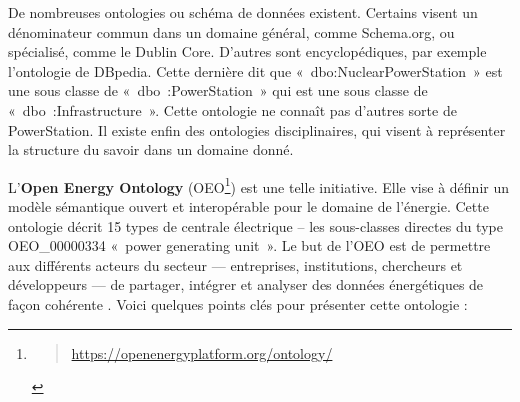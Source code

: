 \documentclass[a4paper,11pt]{report}
\begin{document}
De nombreuses ontologies ou schéma de données existent. Certains visent un dénominateur commun dans un domaine général, comme Schema.org, ou spécialisé, comme le Dublin Core. D'autres sont encyclopédiques, par exemple l'ontologie de DBpedia. Cette dernière dit que «~dbo:NuclearPowerStation~» est une sous classe de «~dbo~:PowerStation~» qui est une sous classe de «~dbo~:Infrastructure~». Cette ontologie ne connaît pas d'autres sorte de PowerStation. Il existe enfin des ontologies disciplinaires, qui visent à représenter la structure du savoir dans un domaine donné.

L'\textbf{\textbf{Open Energy Ontology}} (OEO\footnote{\begin{quote}
  \url{https://openenergyplatform.org/ontology/}
  \end{quote}}) est une telle initiative. Elle vise à définir un modèle sémantique ouvert et interopérable pour le domaine de l'énergie. Cette ontologie décrit 15 types de centrale électrique -- les sous-classes directes du type OEO\_00000334 «~power generating unit~». Le but de l'OEO est de permettre aux différents acteurs du secteur --- entreprises, institutions, chercheurs et développeurs --- de partager, intégrer et analyser des données énergétiques de façon cohérente \citep{G49STI5L}. Voici quelques points clés pour présenter cette ontologie :
\end{document}
